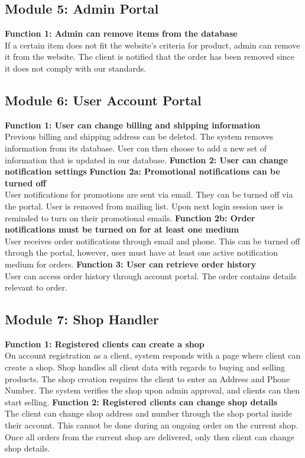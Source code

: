 \subsection*{Module 5: Admin Portal}
\begin{outline}
    \1 \textbf{Function 1: Admin can remove items from the database} \\
    If a certain item does not fit the website's criteria for product, admin can remove it from the website. The client is notified that the order has been removed since it does not comply with our standards.
\end{outline}
\subsection*{Module 6: User Account Portal}
\begin{outline}
    \1 \textbf{Function 1: User can change billing and shipping information} \\
    Previous billing and shipping address can be deleted. The system removes information from its database. User can then choose to add a new set of information that is updated in our database.
    \1 \textbf{Function 2: User can change notification settings}
        \2 \textbf{Function 2a: Promotional notifications can be turned off} \\
        User notifications for promotions are sent via email. They can be turned off via the portal. User is removed from mailing list. Upon next login session user is reminded to turn on their promotional emails.
        \2 \textbf{Function 2b: Order notifications must be turned on for at least one medium} \\
        User receives order notifications through email and phone. This can be turned off through the portal, however, user must have at least one active notification medium for orders.
    \1 \textbf{Function 3: User can retrieve order history} \\
    User can access order history through account portal. The order contains details relevant to order.
\end{outline}
\subsection*{Module 7: Shop Handler}
\begin{outline}
    \1 \textbf{Function 1: Registered clients can create a shop} \\
    On account registration as a client, system responds with a page where client can create a shop. Shop handles all client data with regards to buying and selling products. The shop creation requires the client to enter an Address and Phone Number. The system verifies the shop upon admin approval, and clients can then start selling.
    \1 \textbf{Function 2: Registered clients can change shop details} \\
    The client can change shop address and number through the shop portal inside their account. This cannot be done during an ongoing order on the current shop. Once all orders from the current shop are delivered, only then client can change shop details.
\end{outline}

